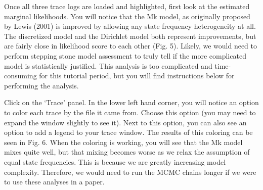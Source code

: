 Once all three trace logs are loaded and highlighted, first look at the estimated marginal likelihoods.
You will notice that the Mk model, as originally proposed by Lewis (2001) is improved by allowing any state frequency heterogeneity at all. 
The discretized model and the Dirichlet model both represent improvements, but are fairly close in likelihood score to each other (Fig. 5).
Likely, we would need to perform stepping stone model assessment to truly tell if the more complicated model is statistically justified.
This analysis is too complicated and time-consuming for this tutorial period, but you will find instructions below for performing the analysis. \par
\begin{figure}[h!]
\label{fig:module-gm}
\end{figure}

Click on the `Trace' panel.
In the lower left hand corner, you will notice an option to color each trace by the file it came from.
Choose this option (you may need to expand the window slightly to see it).
Next to this option, you can also see an option to add a legend to your trace window.
The results of this coloring can be seen in Fig. 6.
When the coloring is working, you will see that the Mk model mixes quite well, but that mixing becomes worse as we relax the assumption of equal state frequencies.
This is because we are greatly increasing model complexity.
Therefore, we would need to run the MCMC chains longer if we were to use these analyses in a paper. \par

\begin{figure}[h!]
\label{fig:module-gm}
\end{figure}

\newpage
